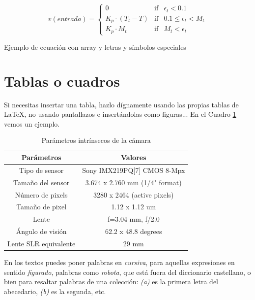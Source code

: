 			\begin{myequation}[h]
				\begin{equation}
					v(entrada)= \left\{
					\begin{array}{lcc}
						0 & \mbox{if} & \epsilon_t < 0.1\\
						K_p\cdot{(T_{t}-T)} & \mbox{if}& 0.1 \leq \epsilon_t < M_t\\
						K_p \cdot M_t & \mbox{if}& M_t < \epsilon_t
					\end{array}
					\right.
					\label{ec:ec2}
				\end{equation}
				\caption[Ejemplo de ecuación con array y letras y símbolos especiales]{Ejemplo de ecuación con array y letras y símbolos especiales}
			\end{myequation}
			
			\section{Tablas o cuadros}
			
			Si necesitas insertar una tabla, hazlo dígnamente usando las propias tablas de \LaTeX, no usando pantallazos e insertándolas como figuras... En el Cuadro \ref{cuadro:ejemplo} vemos un ejemplo.
			
			\begin{table}[H]
				\begin{center}
					\begin{tabular}{|c|c|}
						\hline
						\textbf{Parámetros} & \textbf{Valores} \\
						\hline
						Tipo de sensor & Sony IMX219PQ[7] CMOS 8-Mpx \\
						Tamaño del sensor & 3.674 x 2.760 mm (1/4" format) \\
						Número de pixels & 3280 x 2464 (active pixels) \\
						Tamaño de pixel & 1.12 x 1.12 um \\
						Lente & f=3.04 mm, f/2.0 \\
						Ángulo de visión & 62.2 x 48.8 degrees \\
						Lente SLR equivalente & 29 mm \\
						\hline
					\end{tabular}
					\caption{Parámetros intrínsecos de la cámara}
					\label{cuadro:ejemplo}
				\end{center}
			\end{table}
			
			En los textos puedes poner palabras en \textit{cursiva}, para aquellas expresiones en sentido \textit{figurado}, palabras como \textit{robota}, que está fuera del diccionario castellano, o bien para resaltar palabras de una colección: \textit{(a)} es la primera letra del abecedario, \textit{(b)} es la segunda, etc.\\
			
